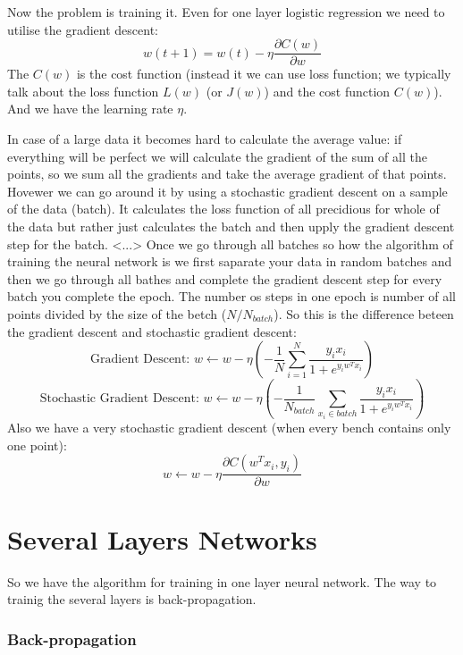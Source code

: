 Now the problem is training it. Even for one layer logistic regression we need to utilise the gradient descent:
$$w(t+1)=w(t)-\eta\frac{\partial C(w)}{\partial w}$$
The $C(w)$ is the cost function (instead it we can use loss function; we typically talk about the loss function $L(w)$ (or $J(w)$) and the cost function $C(w)$). And we have the learning rate $\eta$.

In case of a large data it becomes hard to calculate the average value: if everything will be perfect we will calculate the gradient of the sum of all the points, so we sum all the gradients and take the average gradient of that points. Hovewer we can go around it by using  a stochastic gradient descent on a sample of the data (batch). It calculates the loss function of all precidious for whole of the data but rather just calculates the batch and then upply the gradient descent step for the batch. <...>
Once we go through all batches so how the algorithm of training the neural network is we first saparate your data in random batches and then we go through all bathes and complete the gradient descent step for every batch you complete the epoch. The number os steps in one epoch is number of all points divided by the size of the betch ($N / N_{batch}$).
So this is the difference beteen the gradient descent and stochastic gradient descent:
$$\text{Gradient Descent: }w\leftarrow w-\eta\left(-\frac{1}{N}\sum\limits_{i=1}^N\frac{y_ix_i}{1+e^{y_iw^Tx_i}}\right)$$
$$\text{Stochastic Gradient Descent: }w\leftarrow w-\eta\left(-\frac{1}{N_{batch}}\sum\limits_{x_i\in batch}\frac{y_ix_i}{1+e^{y_iw^Tx_i}}\right)$$
Also we have a very stochastic gradient descent (when every bench contains only one point):
$$w\leftarrow w-\eta\frac{\partial C(w^Tx_i,y_i)}{\partial w}$$
{\it <The reason why very stochastic gradients descent is not he best way>}

\section{Several Layers Networks}

So we have the algorithm for training in one layer neural network. The way to trainig the several layers is back-propagation. 

\subsubsection*{Back-propagation}

